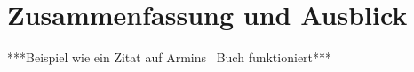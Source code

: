 
\chapter{Zusammenfassung und Ausblick}
***Beispiel wie ein Zitat auf Armins~\citep{Bolz} Buch funktioniert***